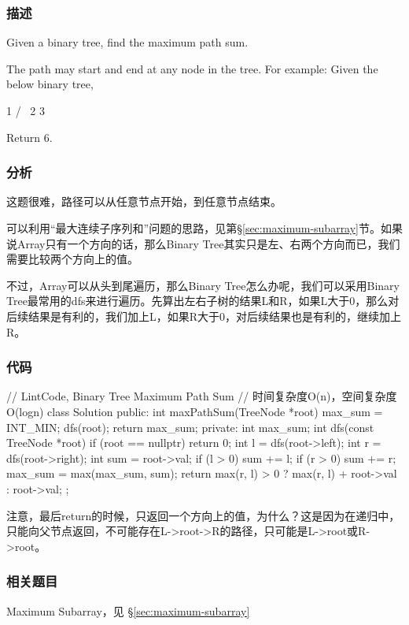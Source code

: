 \subsubsection{描述}
Given a binary tree, find the maximum path sum.

The path may start and end at any node in the tree.
For example:
Given the below binary tree,
\begin{Code}
  1
 / \
2   3
\end{Code}
Return $6$.


\subsubsection{分析}
这题很难，路径可以从任意节点开始，到任意节点结束。

可以利用“最大连续子序列和”问题的思路，见第\S \ref{sec:maximum-subarray}节。如果说Array只有一个方向的话，那么Binary Tree其实只是左、右两个方向而已，我们需要比较两个方向上的值。

不过，Array可以从头到尾遍历，那么Binary Tree怎么办呢，我们可以采用Binary Tree最常用的dfs来进行遍历。先算出左右子树的结果L和R，如果L大于0，那么对后续结果是有利的，我们加上L，如果R大于0，对后续结果也是有利的，继续加上R。

\subsubsection{代码}

\begin{Code}
// LintCode, Binary Tree Maximum Path Sum
// 时间复杂度O(n)，空间复杂度O(logn)
class Solution {
public:
    int maxPathSum(TreeNode *root) {
        max_sum = INT_MIN;
        dfs(root);
        return max_sum;
    }
private:
    int max_sum;
    int dfs(const TreeNode *root) {
        if (root == nullptr) return 0;
        int l = dfs(root->left);
        int r = dfs(root->right);
        int sum = root->val;
        if (l > 0) sum += l;
        if (r > 0) sum += r;
        max_sum = max(max_sum, sum);
        return max(r, l) > 0 ? max(r, l) + root->val : root->val;
    }
};
\end{Code}

注意，最后return的时候，只返回一个方向上的值，为什么？这是因为在递归中，只能向父节点返回，不可能存在L->root->R的路径，只可能是L->root或R->root。


\subsubsection{相关题目}
\begindot
\item Maximum Subarray，见 \S \ref{sec:maximum-subarray}
\myenddot


